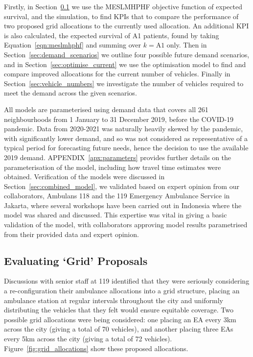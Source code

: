 \documentclass[numbers,webpdf,imaman]{ima-authoring-template}%
\begin{document}
Firstly, in Section~\ref{sec:analysis_grid} we use the MESLMHPHF objective
function of expected survival, and the simulation, to find KPIs that to compare
the performance of two proposed grid allocations to the currently used
allocation. An additional KPI is also calculated, the expected survival of A1
patients, found by taking Equation~\ref{eqn:meslmhphf} and summing over
$k = \text{A1}$ only.
Then in Section~\ref{sec:demand_scenarios} we outline four possible
future demand scenarios, and in Section~\ref{sec:optimise_current} we use the
optimisation model to find and compare improved allocations for the current
number of vehicles. Finally in Section~\ref{sec:vehicle_numbers} we investigate
the number of vehicles required to meet the demand across the given scenarios.

All models are parameterised using demand data that covers all 261
neighbourhoods from 1 January to 31 December 2019, before the COVID-19
pandemic. Data from 2020-2021 was naturally heavily skewed by the pandemic,
with significantly lower demand, and so was not considered as representative
of a typical period for forecasting future needs, hence the decision to use
the available 2019 demand. APPENDIX~\ref{apx:parameters}
provides further details on the parameterisation of the model, including how
travel time estimates were obtained.
Verification of the models were discussed in
Section~\ref{sec:combined_model}, we validated based on expert opinion from
our collaborators, Ambulans 118 and the 119 Emergency Ambulance Service in
Jakarta, where several workshops have been carried out in Indonesia where the
model was shared and discussed. This expertise was vital in giving a basic
validation of the model, with collaborators approving model results
parametrised from their provided data and expert opinion.


\subsection{Evaluating `Grid' Proposals}\label{sec:analysis_grid}
Discussions with senior staff at 119 identified that they were seriously
considering a re-configuration their ambulance allocations into a grid
structure, placing an ambulance station at regular intervals throughout the city
and uniformly distributing the vehicles that they felt would ensure equitable
coverage. Two possible grid allocations were being considered: one placing an
EA every 3km across the city (giving a total of 70 vehicles), and another
placing three EAs every 5km across the city (giving a total of 72 vehicles).
Figure~\ref{fig:grid_allocations} show these proposed allocations.
\end{document}
